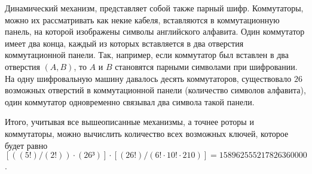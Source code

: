 Динамический механизм, представляет собой также парный шифр. Коммутаторы, можно их рассматривать как некие кабеля, вставляются в коммутационную панель, на которой изображены символы английского алфавита. Один коммутатор имеет два конца, каждый из которых вставляется в два отверстия коммутационной панели. Так, например, если коммутатор был вставлен в два отверстия $(A, B)$, то $A$ и $B$ становятся парными символами при шифровании. На одну шифровальную машину давалось десять коммутаторов, существовало $26$ возможных отверстий в коммутационной панели (количество символов алфавита), один коммутатор одновременно связывал два символа такой панели.

Итого, учитывая все вышеописанные механизмы, а точнее роторы и коммутаторы, можно вычислить количество всех возможных ключей, которое будет равно $[((5!) / (2!)) \cdot (26³)] \cdot [(26!) / (6! \cdot 10! \cdot 210)] = 158 962 555 217 826 360 000$.